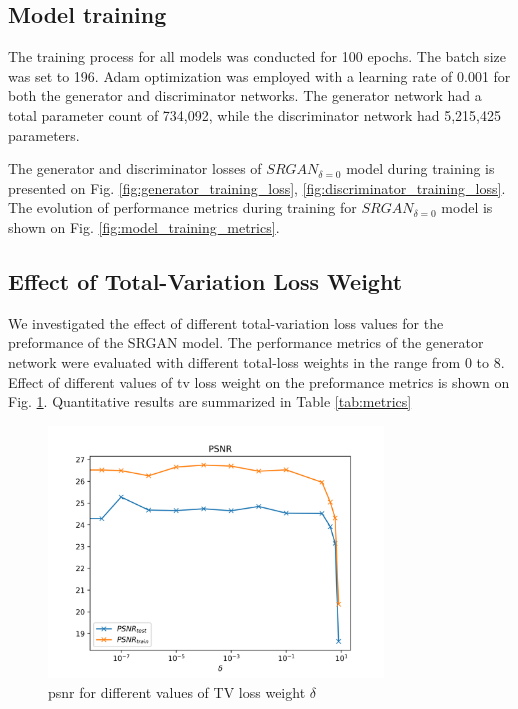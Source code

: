 \documentclass[conference]{IEEEtran}
\begin{document}
\subsection{Model training}

The training process for all models was conducted for 100 epochs. The batch size was set to 196. Adam optimization was employed with a learning rate of 0.001 for both the generator and discriminator networks. The generator network had a total parameter count of 734,092, while the discriminator network had 5,215,425 parameters.

The generator and discriminator losses of $SRGAN_{\delta=0}$ model during training is presented on Fig. \ref{fig:generator_training_loss}, \ref{fig:discriminator_training_loss}. The evolution of performance metrics during training for $SRGAN_{\delta=0}$ model is shown on Fig. \ref{fig:model_training_metrics}.

\subsection{Effect of Total-Variation Loss Weight\label{sec:effect_of_tv_weight}}

We investigated the effect of different total-variation loss values for the preformance of the SRGAN model. The performance metrics of the generator network were evaluated with different total-loss weights in the range from 0 to 8. Effect of different values of \acrlong{tv} loss weight on the preformance metrics is shown on Fig. \ref{fig:tv_metrics}. Quantitative results are summarized in Table \ref{tab:metrics}

\begin{figure}[htb]
	\centering
    \centerline{\includegraphics[width=8.9cm]{results/tv_psnr}}
	\caption{\acrshort{psnr} for different values of TV loss weight $\delta$}
	\label{fig:tv_metrics}
\end{figure}
\end{document}
